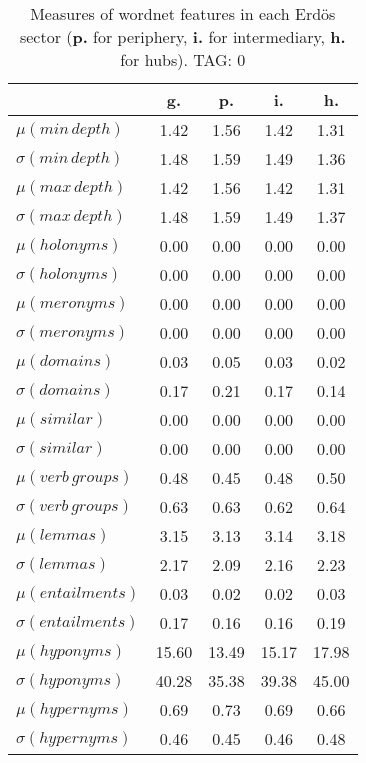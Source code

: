 \begin{table}[h!]
\begin{center}
\begin{tabular}{| l || c | c | c | c |}\hline
 & {\bf g.} & {\bf p.} & {\bf i.} & {\bf h.} \\\hline\hline
$\mu(min\,depth)$ & 1.42  & 1.56  & 1.42  & 1.31 \\
$\sigma(min\,depth)$ & 1.48  & 1.59  & 1.49  & 1.36 \\\hline
$\mu(max\,depth)$ & 1.42  & 1.56  & 1.42  & 1.31 \\
$\sigma(max\,depth)$ & 1.48  & 1.59  & 1.49  & 1.37 \\\hline
$\mu(holonyms)$ & 0.00  & 0.00  & 0.00  & 0.00 \\
$\sigma(holonyms)$ & 0.00  & 0.00  & 0.00  & 0.00 \\\hline
$\mu(meronyms)$ & 0.00  & 0.00  & 0.00  & 0.00 \\
$\sigma(meronyms)$ & 0.00  & 0.00  & 0.00  & 0.00 \\\hline
$\mu(domains)$ & 0.03  & 0.05  & 0.03  & 0.02 \\
$\sigma(domains)$ & 0.17  & 0.21  & 0.17  & 0.14 \\\hline
$\mu(similar)$ & 0.00  & 0.00  & 0.00  & 0.00 \\
$\sigma(similar)$ & 0.00  & 0.00  & 0.00  & 0.00 \\\hline
$\mu(verb\,groups)$ & 0.48  & 0.45  & 0.48  & 0.50 \\
$\sigma(verb\,groups)$ & 0.63  & 0.63  & 0.62  & 0.64 \\\hline
$\mu(lemmas)$ & 3.15  & 3.13  & 3.14  & 3.18 \\
$\sigma(lemmas)$ & 2.17  & 2.09  & 2.16  & 2.23 \\\hline
$\mu(entailments)$ & 0.03  & 0.02  & 0.02  & 0.03 \\
$\sigma(entailments)$ & 0.17  & 0.16  & 0.16  & 0.19 \\\hline
$\mu(hyponyms)$ & 15.60  & 13.49  & 15.17  & 17.98 \\
$\sigma(hyponyms)$ & 40.28  & 35.38  & 39.38  & 45.00 \\\hline
$\mu(hypernyms)$ & 0.69  & 0.73  & 0.69  & 0.66 \\
$\sigma(hypernyms)$ & 0.46  & 0.45  & 0.46  & 0.48 \\\hline
\end{tabular}
\caption{Measures of wordnet features in each Erd\"os sector ({{\bf p.}} for periphery, {{\bf i.}} for intermediary, {{\bf h.}} for hubs). TAG: 0}
\end{center}
\end{table}